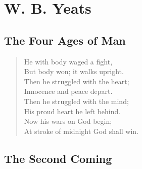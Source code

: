 \documentclass[10pt,a5paper,oneside]{book}
\begin{document}
\part{W. B. Yeats}

\chapter{The Four Ages of Man}

\begin{verse}
He with body waged a fight,\\
But body won; it walks upright.\\
Then he struggled with the heart;\\
Innocence and peace depart.\\
Then he struggled with the mind;\\
His proud heart he left behind.\\
Now his wars on God begin;\\
At stroke of midnight God shall win.
\end{verse}

\chapter{The Second Coming}
\end{document}
